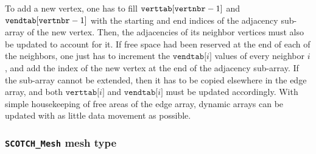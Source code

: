 To add a new vertex, one has to fill $\mathtt{verttab[\lbt vertnbr}
-1\mathtt{]}$ and $\mathtt{vendtab[\lbt vertnbr}\lbt -1\mathtt{]}$
with the starting and end indices of the adjacency sub-array of the
new vertex. Then, the adjacencies of its neighbor vertices must also
be updated to account for it. If free space had been reserved at the
end of each of the neighbors, one just has to increment the
$\mathtt{vendtab[}i\mathtt{]}$ values of every neighbor $i$, and add
the index of the new vertex at the end of the adjacency sub-array. If
the sub-array cannot be extended, then it has to be copied elsewhere
in the edge array, and both $\mathtt{verttab[}i\mathtt{]}$ and
$\mathtt{vendtab[}i\mathtt{]}$ must be updated accordingly. With
simple housekeeping of free areas of the edge array, dynamic arrays
can be updated with as little data movement as possible.

\subsubsection{\texttt{SCOTCH\_\lbt Mesh} mesh type}
\label{sec-lib-type-mesh}


